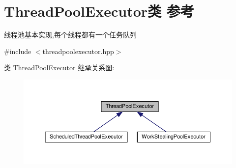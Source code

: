 \hypertarget{classThreadPoolExecutor}{}\section{Thread\+Pool\+Executor类 参考}
\label{classThreadPoolExecutor}


线程池基本实现,每个线程都有一个任务队列  




{\ttfamily \#include $<$threadpoolexecutor.\+hpp$>$}



类 Thread\+Pool\+Executor 继承关系图\+:
\nopagebreak
\begin{figure}[H]
\begin{center}
\leavevmode
\includegraphics[width=350pt]{classThreadPoolExecutor__inherit__graph}
\end{center}
\end{figure}
